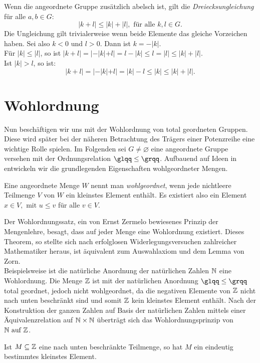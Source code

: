 Wenn die angeordnete Gruppe zusätzlich abelsch ist, gilt die \textit{Dreiecksungleichung} für alle $a, b \in G$:
\[|k+ l | \le |k| + |l|, \text{ für alle } k, l \in G.\]
Die Ungleichung gilt trivialerweise wenn beide Elemente das gleiche Vorzeichen haben. Sei also $k < 0$ und $l > 0$. Dann ist $k= -|k|$.\\
Für $|k|\le |l|$, so ist $|k + l |= |-|k|+l| = l - |k| \le l = |l|\le|k| + |l|$. \\
Ist $|k| >l$, so ist: 
\[|k+l| = |-|k| + l| = |k| - l \le |k|\le |k| + |l|.\]                                                                                                                       
%
\newpage
\section{Wohlordnung}
Nun beschäftigen wir uns mit der Wohlordnung von total geordneten Gruppen. Diese wird später bei der näheren Betrachtung des Trägers einer Potenzreihe eine wichtige Rolle spielen. 
Im Folgenden sei $G \neq \varnothing$ eine angeordnete Gruppe versehen mit der Ordnungsrelation $\glqq\leq \grqq$. Aufbauend auf Ideen in \cite[S. 16]{fuchs66} entwickeln wir die grundlegenden Eigenschaften wohlgeordneter Mengen.
\begin{defn} \label{wohlgeordn} %
Eine angeordnete Menge $W$ nennt man \textit{wohlgeordnet}, wenn jede nichtleere Teilmenge $V$ von $W$ ein kleinstes Element enthält. Es existiert also ein Element $ x \in V, \text{ mit } u \le v $ für alle $ v \in V.$ 
\end{defn}
%
Der Wohlordnungssatz, ein von Ernst Zermelo bewiesenes Prinzip der Mengenlehre, besagt, dass auf jeder Menge eine Wohlordnung existiert. Dieses Theorem, so stellte sich nach erfolglosen Widerlegungsversuchen zahlreicher Mathematiker heraus, ist äquivalent zum Auswahlaxiom und dem Lemma von Zorn. \\
Beispielsweise ist die natürliche Anordnung der natürlichen Zahlen $\mathbb{N}$ eine Wohlordnung. Die Menge $\mathbb{Z}$ ist mit der natürlichen Anordnung $\glqq\leq\grqq$ total geordnet, jedoch nicht wohlgeordnet, da die negativen Elemente von $\mathbb{Z}$ nicht nach unten beschränkt sind und somit $\mathbb{Z}$ kein kleinstes Element enthält. Nach der Konstruktion der ganzen Zahlen auf Basis der natürlichen Zahlen mittels einer Äquivalenzrelation auf $\mathbb{N} \times \mathbb{N}$  überträgt sich das Wohlordnungsprinzip von $\mathbb{N} \text{ auf } \mathbb{Z}$.
\begin{bem} %
Ist $M \subseteq \mathbb{Z}$ eine nach unten beschränkte Teilmenge, so hat $M$ ein eindeutig bestimmtes kleinstes Element. 
\end{bem} 
